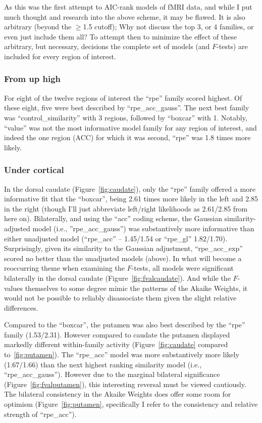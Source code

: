\documentclass[doc,12pt]{apa}        %
\begin{document}
As this was the first attempt to AIC-rank models of fMRI data, and while I put much thought and research into the above scheme, it may be flawed.  It is also arbitrary (beyond the $\ge$1.5 cutoff); Why not discuss the top 3, or 4 families, or even just include them all?  To attempt then to minimize the effect of these arbitrary, but necessary, decisions the complete set of models (and $F$-tests) are included for every region of interest.


\subsubsection{From up high}
\label{subsub:fromuphigh}
For eight of the twelve regions of interest the ``rpe'' family scored highest.  Of these eight, five were best described by ``rpe\_acc\_gauss''.  The next best family was ``control\_similarity'' with 3 regions, followed by ``boxcar'' with 1.  Notably, ``value'' was not the most informative model family for any region of interest, and indeed the one region (ACC) for which it was second, ``rpe'' was 1.8 times more likely.


\subsubsection{Under cortical}
\label{subsub:belowctx}
In the dorsal caudate (Figure~\ref{fig:caudate}), only the ``rpe'' family offered a more informative fit that the ``boxcar'', being 2.61 times more likely in the left and 2.85 in the right (though I'll just abbreviate left/right likelihoods as 2.61/2.85 from here on).  Bilaterally, and using the ``acc'' coding scheme, the Gaussian similarity-adjusted model (i.e., ''rpe\_acc\_gauss'') was substantively more informative than either unadjusted model (``rpe\_acc'' -- 1.45/1.54 or ``rpe\_gl'' 1.82/1.70).  Surprisingly, given its similarity to the Gaussian adjustment, ``rpe\_acc\_exp'' scored no better than the unadjusted models (above).  In what will become a reoccurring theme when examining the $F$-tests, all models were significant bilaterally in the dorsal caudate (Figure~\ref{fig:fvalcaudate}).  And while the $F$-values themselves to some degree mimic the patterns of the Akaike Weights, it would not be possible to reliably disassociate them given the slight relative differences.  

Compared to the ``boxcar'', the putamen was also best described by the ``rpe'' family (1.53/2.31).  However compared to caudate the putamen displayed markedly different within-family activity (Figure~\ref{fig:caudate} compared to~\ref{fig:putamen}). The ``rpe\_acc'' model was more substantively more likely (1.67/1.66) than the next highest ranking similarity model (i.e., ``rpe\_acc\_gauss'').  However due to the marginal bilateral significance (Figure~\ref{fig:fvalputamen}), this interesting reversal must be viewed cautiously.  The bilateral consistency in the Akaike Weights does offer some room for optimism (Figure~\ref{fig:putamen}, specifically I refer to the consistency and relative strength of ``rpe\_acc'').
\end{document}
